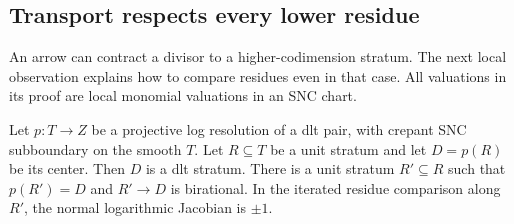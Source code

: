\subsection{Transport respects every lower residue}

An arrow can contract a divisor to a higher-codimension stratum.  The next
local observation explains how to compare residues even in that case.
All valuations in its proof are local monomial valuations in an SNC chart.

\begin{lemma}\label{floor:unit-strata}
Let \(p:T\to Z\) be a projective log resolution of a dlt pair, with
crepant SNC subboundary on the smooth \(T\).  Let \(R\subseteq T\) be a
unit stratum and let \(D=p(R)\) be its center.  Then
\(D\) is a dlt stratum.  There is a unit stratum \(R'\subseteq R\) such
that \(p(R')=D\) and \(R'\to D\) is birational.  In the iterated residue
comparison along \(R'\), the normal logarithmic Jacobian is \(\pm1\).
\end{lemma}

